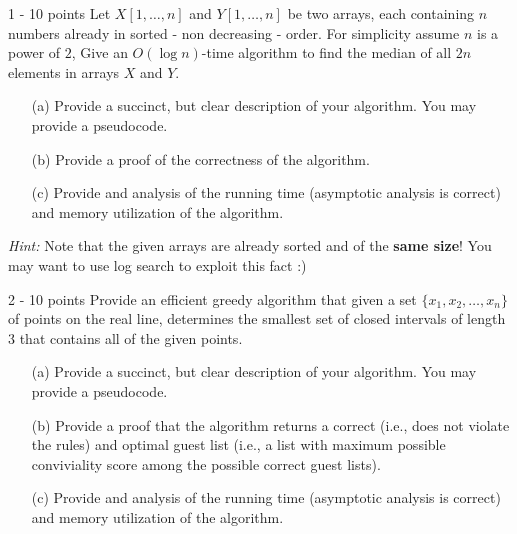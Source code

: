 \documentclass{common/cs157}
\begin{document}
\midtermpolicyremind{}

\begin{problem}{1 - 10 points}
Let $X[1,\ldots,n]$ and $Y[1,\ldots,n]$ be two arrays, each containing $n$ numbers already in sorted - non decreasing - order. For simplicity assume $n$ is a power of $2$, Give an $O(\log n)$-time algorithm to find the median of all $2n$ elements in arrays $X$ and $Y$.
\begin{enumerate}
    \item[(a)] Provide a succinct, but clear description of your algorithm. You may provide a pseudocode.
    \item[(b)] Provide a proof of the correctness of the algorithm.
    \item[(c)] Provide and analysis of the running time (asymptotic analysis is correct) and memory utilization of the algorithm.
\end{enumerate}
\noindent \emph{Hint:} Note that the given arrays are already sorted and of the \textbf{same size}! You may want to use log search to exploit this fact :)
\end{problem}


\begin{problem}{2 - 10 points}
Provide an efficient greedy algorithm that given a set $\{x_1,x_2,\ldots,x_n\}$ of points on the real line, determines the smallest set of  closed intervals of length 3 that contains all of the given points.
\begin{enumerate}
    \item[(a)] Provide a succinct, but clear description of your algorithm. You may provide a pseudocode.
    \item[(b)] Provide a proof that the algorithm returns a correct (i.e., does not violate the rules) and optimal guest list (i.e., a list with maximum possible conviviality score among the possible correct guest lists).
    \item[(c)] Provide and analysis of the running time (asymptotic analysis is correct) and memory utilization of the algorithm.
\end{enumerate}
\end{problem}
\end{document}
